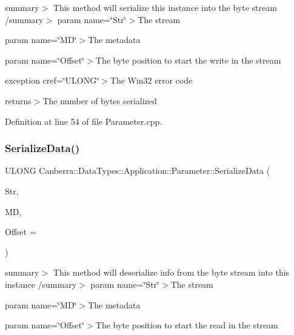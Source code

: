 summary$>$ This method will serialize this instance into the byte stream /summary$>$ param name=\char`\"{}\+Str\char`\"{}$>$The stream

param name=\char`\"{}\+M\+D\char`\"{}$>$The metadata

param name=\char`\"{}\+Offset\char`\"{}$>$The byte position to start the write in the stream

exception cref=\char`\"{}\+U\+L\+O\+N\+G\char`\"{}$>$The Win32 error code

returns$>$The number of bytes serialized

Definition at line 54 of file Parameter.\+cpp.

\mbox{\label{class_canberra_1_1_data_types_1_1_application_1_1_parameter_a2c39a0404f163579143f14ece019ff6c_a2c39a0404f163579143f14ece019ff6c}} 
\subsubsection{\texorpdfstring{Serialize\+Data()}{SerializeData()}}
{\footnotesize\ttfamily U\+L\+O\+NG Canberra\+::\+Data\+Types\+::\+Application\+::\+Parameter\+::\+Serialize\+Data (\begin{DoxyParamCaption}\item[{\hyperlink{class_canberra_1_1_utility_1_1_core_1_1_byte_stream}{Canberra\+::\+Utility\+::\+Core\+::\+Byte\+Stream} \&}]{Str,  }\item[{const \hyperlink{class_canberra_1_1_serialization_1_1_meta_data}{Canberra\+::\+Serialization\+::\+Meta\+Data} \&}]{MD,  }\item[{const L\+O\+NG}]{Offset = {} }\end{DoxyParamCaption})\hspace{0.3cm}{\ttfamily [virtual]}}

summary$>$ This method will deserialize info from the byte stream into this instance /summary$>$ param name=\char`\"{}\+Str\char`\"{}$>$The stream

param name=\char`\"{}\+M\+D\char`\"{}$>$The metadata

param name=\char`\"{}\+Offset\char`\"{}$>$The byte position to start the read in the stream

